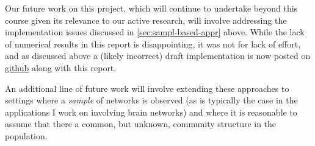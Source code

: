 \documentclass[11pt]{article}   %
\begin{document}
Our future work on this project, which will continue to undertake beyond this course given its relevance to our active research, will involve addressing the implementation issues discussed in \autoref{sec:sampl-based-appr} above.
While the lack of numerical results in this report is disappointing, it was not for lack of effort, and as discussed above a (likely incorrect) draft implementation is now posted on  \href{https://github.com/dankessler/608b-project}{github} along with this report.

An additional line of future work will involve extending these approaches to settings where a \emph{sample} of networks is observed (as is typically the case in the applications I work on involving brain networks) and where it is reasonable to assume that there a common, but unknown, community structure in the population.




\printbibliography
\end{document}
